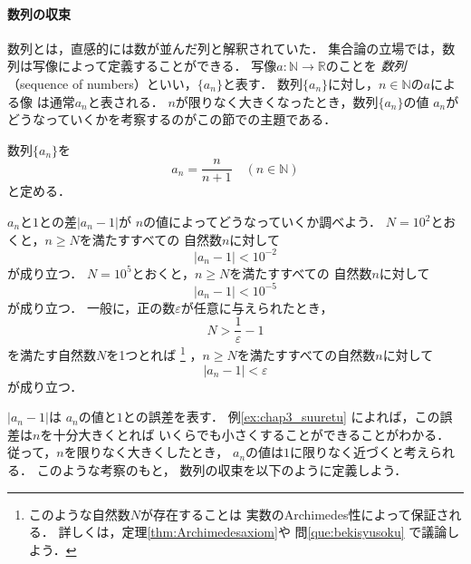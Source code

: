     \paragraph{数列の収束}
     数列とは，直感的には数が並んだ列と解釈されていた．
     集合論の立場では，数列は写像によって定義することができる．
     写像$a: \mathbb{N} \longrightarrow \mathbb{R}$のことを
     \emph{数列}（sequence of numbers）といい，$\{a_n \}$と表す．
     数列$\{ a_n \}$に対し，$n \in \mathbb{N}$の$a$による像
     は通常$a_n$と表される．
     $n$が限りなく大きくなったとき，数列$\{ a_n \}$の値
     $a_n$がどうなっていくかを考察するのがこの節での主題である．

     \begin{ex} \label{ex:chap3_suuretu}
       数列$\{ a_n \}$を
       \[
         a_n = \frac{n}{n+1} \quad ( n \in \mathbb{N} )
       \]
       と定める．

       $a_n$と$1$との差$\lvert a_n -1 \rvert$が
       $n$の値によってどうなっていくか調べよう．
       $N = 10^2 $とおくと，$n \geq N$を満たすすべての
       自然数$n$に対して
       \[
         \lvert a_n - 1 \rvert < 10^{-2}
       \]
       が成り立つ．
       $N= 10 ^5 $とおくと，$n \geq N$を満たすすべての
       自然数$n$に対して
       \[
         \lvert a_n -1 \rvert < 10^{-5}
       \]
       が成り立つ．
       一般に，正の数$\varepsilon$が任意に与えられたとき，
       \[
         N > \frac{1}{\varepsilon} -1 
       \]
       を満たす自然数$N$を1つとれば
       \footnote{
         このような自然数$N$が存在することは
         実数のArchimedes性によって保証される．
         詳しくは，定理\ref{thm:Archimedesaxiom}や
         問\ref{que:bekisyusoku}
       で議論しよう．}
       ，$n \geq N$を満たすすべての自然数$n$に対して
       \[
         \lvert a_n - 1 \rvert < \varepsilon
       \]
       が成り立つ．
     \end{ex}

     $\lvert a_n - 1 \rvert$は
     $a_n$の値と$1$との誤差を表す．
     例\ref{ex:chap3_suuretu}
     によれば，この誤差は$n$を十分大きくとれば
     いくらでも小さくすることができることがわかる．
     従って，$n$を限りなく大きくしたとき，
     $a_n$の値は$1$に限りなく近づくと考えられる．
     このような考察のもと，
     数列の収束を以下のように定義しよう．
    

